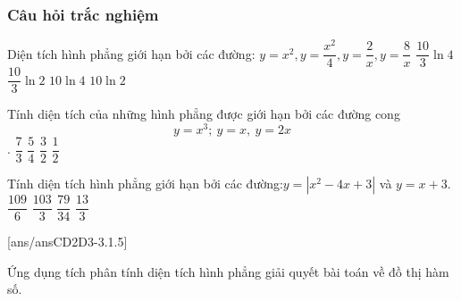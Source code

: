 \subsubsection{Câu hỏi trắc nghiệm}
\begin{ex}%
	Diện tích hình phẳng giới hạn bởi các đường: $y=x^2,y=\dfrac{x^2}{4},y=\dfrac{2}{x},y=\dfrac{8}{x}$ 
	\choice
	{\True $\dfrac{10}{3}\ln 4$}
	{$\dfrac{10}{3}\ln 2$}
	{$10\ln 4$}
	{$10\ln 2$}
\end{ex}
\begin{ex}%
	Tính diện tích của những hình phẳng được giới hạn bởi các đường cong \[y=x^3;\ y=x,\ y=2x\] .
	\choice
	{$\dfrac{7}{3}$}
	{$\dfrac{5}{4}$}
	{\True $\dfrac{3}{2}$}
	{$\dfrac{1}{2}$}
\end{ex}
\begin{ex}%
	Tính diện tích hình phẳng giới hạn bởi các đường:$y=\left|x^2-4x+3\right|$ và $y=x+3$.
	\choice
	{\True $\dfrac{109}{6}$}
	{$\dfrac{103}{3}$}
	{$\dfrac{79}{34}$}
	{$\dfrac{13}{3}$}
\end{ex}
{}
[ans/ansCD2D3-3.1.5]
\begin{dang}{Ứng dụng tích phân tính diện tích hình phẳng giải quyết bài toán về đồ thị hàm số.}
\end{dang}
